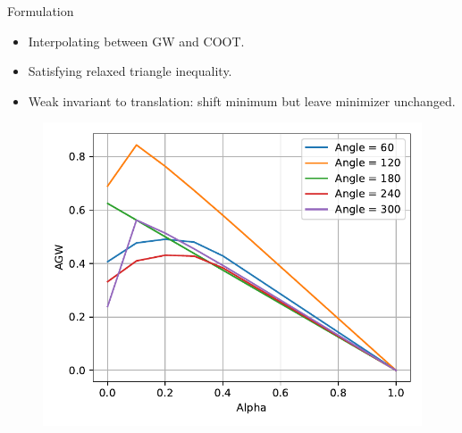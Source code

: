 \documentclass{beamer}
\begin{document}
\begin{frame}{Formulation}
\begin{minipage}[t]{0.6\linewidth}
  \begin{itemize}
    \item Interpolating between GW and COOT.
    \item Satisfying relaxed triangle inequality.
    \item Weak invariant to translation: shift minimum but leave minimizer unchanged.
  \end{itemize}
  \end{minipage}%
  \hfill%
  \hspace{-6cm}
  \begin{minipage}[t]{0.4\linewidth}
    \vspace{-0.2cm}
  \begin{figure}
    \centering
    \includegraphics[width=1.1\linewidth, keepaspectratio=true]{OT_new/agw_alpha.pdf}
  \end{figure}
  \end{minipage}

\end{frame}
\end{document}
